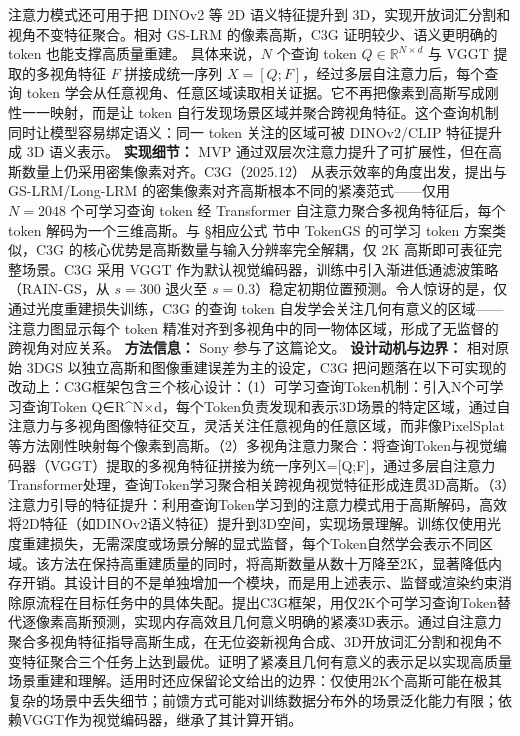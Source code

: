注意力模式还可用于把 DINOv2 等 2D 语义特征提升到 3D，实现开放词汇分割和视角不变特征聚合。相对 GS-LRM 的像素高斯，C3G 证明较少、语义更明确的 token 也能支撑高质量重建。
具体来说，$N$ 个查询 token $Q\in\mathbb{R}^{N\times d}$ 与 VGGT 提取的多视角特征 $F$ 拼接成统一序列 $X=[Q;F]$，经过多层自注意力后，每个查询 token 学会从任意视角、任意区域读取相关证据。它不再把像素到高斯写成刚性一一映射，而是让 token 自行发现场景区域并聚合跨视角特征。这个查询机制同时让模型容易绑定语义：同一 token 关注的区域可被 DINOv2/CLIP 特征提升成 3D 语义表示。
\textbf{实现细节：} MVP 通过双层次注意力提升了可扩展性，但在高斯数量上仍采用密集像素对齐。C3G（2025.12） 从表示效率的角度出发，提出与 GS-LRM/Long-LRM 的密集像素对齐高斯根本不同的紧凑范式——仅用 $N{=}2048$ 个可学习查询 token 经 Transformer 自注意力聚合多视角特征后，每个 token 解码为一个三维高斯。与 §相应公式 节中 TokenGS 的可学习 token 方案类似，C3G 的核心优势是高斯数量与输入分辨率完全解耦，仅 2K 高斯即可表征完整场景。C3G 采用 VGGT 作为默认视觉编码器，训练中引入渐进低通滤波策略（RAIN-GS，从 $s{=}300$ 退火至 $s{=}0.3$）稳定初期位置预测。令人惊讶的是，仅通过光度重建损失训练，C3G 的查询 token 自发学会关注几何有意义的区域——注意力图显示每个 token 精准对齐到多视角中的同一物体区域，形成了无监督的跨视角对应关系。
\textbf{方法信息：} Sony 参与了这篇论文。
\textbf{设计动机与边界：} 相对原始 3DGS 以独立高斯和图像重建误差为主的设定，C3G 把问题落在以下可实现的改动上：C3G框架包含三个核心设计：（1）可学习查询Token机制：引入N个可学习查询Token Q∈R\^{}{N×d}，每个Token负责发现和表示3D场景的特定区域，通过自注意力与多视角图像特征交互，灵活关注任意视角的任意区域，而非像PixelSplat等方法刚性映射每个像素到高斯。（2）多视角注意力聚合：将查询Token与视觉编码器（VGGT）提取的多视角特征拼接为统一序列X=[Q;F]，通过多层自注意力Transformer处理，查询Token学习聚合相关跨视角视觉特征形成连贯3D高斯。（3）注意力引导的特征提升：利用查询Token学习到的注意力模式用于高斯解码，高效将2D特征（如DINOv2语义特征）提升到3D空间，实现场景理解。训练仅使用光度重建损失，无需深度或场景分解的显式监督，每个Token自然学会表示不同区域。该方法在保持高重建质量的同时，将高斯数量从数十万降至2K，显著降低内存开销。其设计目的不是单独增加一个模块，而是用上述表示、监督或渲染约束消除原流程在目标任务中的具体失配。提出C3G框架，用仅2K个可学习查询Token替代逐像素高斯预测，实现内存高效且几何意义明确的紧凑3D表示。通过自注意力聚合多视角特征指导高斯生成，在无位姿新视角合成、3D开放词汇分割和视角不变特征聚合三个任务上达到最优。证明了紧凑且几何有意义的表示足以实现高质量场景重建和理解。适用时还应保留论文给出的边界：仅使用2K个高斯可能在极其复杂的场景中丢失细节；前馈方式可能对训练数据分布外的场景泛化能力有限；依赖VGGT作为视觉编码器，继承了其计算开销。

